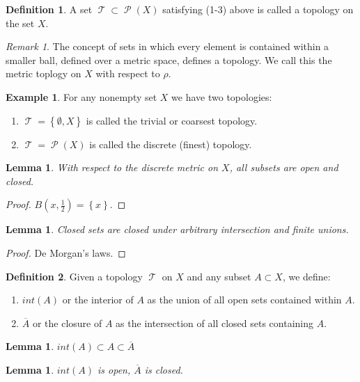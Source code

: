 \documentclass{article}
\renewcommand\O{\ensuremath{\emptyset}}
\DeclareMathOperator{\ps}{\mathcal{P}}
\DeclareMathOperator{\T}{\mathcal{T}}
\newtheorem{lemma}[theorem]{Lemma}
\theoremstyle{definition}
\newtheorem{definition}{Definition}[subsection]
\newtheorem{eg}{Example}[subsection]
\theoremstyle{remark}
\newtheorem*{remark}{Remark}
\theoremstyle{plain}
\begin{document}
\begin{definition}
    A set \(\T \subset \ps(X)\) satisfying (1-3) above is called a topology on the set \(X\).
\end{definition}

\begin{remark}
    The concept of sets in which every element is contained within a smaller ball, defined over a metric space, defines a topology. We call this the metric toplogy on \(X\)  with respect to \(\rho\).
\end{remark}

\begin{eg}
    For any nonempty set \(X\) we have two  topologies:
    \begin{enumerate}
        \item \(\T = \left\{ \O, X \right\}\) is called the trivial or coarsest topology. 
        \item \(\T = \ps(X)\) is called the discrete (finest) topology. 
    \end{enumerate}
\end{eg}

\begin{lemma}
    With respect to the discrete metric on \(X\), all subsets are open and closed.
\end{lemma}
\begin{proof}
    \(B(x,\frac{1}{2}) = \left\{ x \right\}\). 
\end{proof}

\begin{lemma}
    Closed sets are closed under arbitrary intersection and finite unions.
\end{lemma}
\begin{proof}
    De Morgan's laws. 
\end{proof}

\begin{definition}
    Given a topology \(\T\) on \(X\) and any subset \(A \subset X\), we define:
    \begin{enumerate}
        \item \(int(A)\) or the interior of \(A\) as the union of all open sets contained within \(A\).
        \item \(\overline{A}\) or the closure of \(A\) as the intersection of all closed sets containing \(A\).
    \end{enumerate}
\end{definition}

\begin{lemma}
    \(int(A) \subset A \subset \overline{A}\)
\end{lemma}
\begin{lemma}
    \(int(A)\) is open, \(\overline{A}\) is closed.
\end{lemma}
\end{document}
